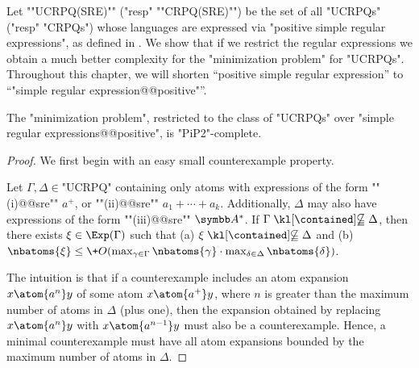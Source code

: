 \AP Let ""UCRPQ(SRE)"" ("resp" ""CRPQ(SRE)"") be the set of all "UCRPQs" ("resp" "CRPQs") whose languages are expressed via "positive simple regular expressions", as defined in . We show that if we restrict the regular expressions we obtain a much better complexity for the "minimization problem" for "UCRPQs".
Throughout this chapter, we will shorten ``positive simple regular expression''
to ``"simple regular expression@@positive"''.

\begin{theorem}\AP\label{thm:minimization-SRE}
	The "minimization problem", restricted to the class of "UCRPQs" over "simple regular expressions@@positive", is "PiP2"-complete.
\end{theorem}

\begin{proof}
	We first begin with an easy small counterexample property.
	\begin{claim}
		\AP\label{cl:small-counterexample-SRE}
		Let $\Gamma, \Delta \in \text{"UCRPQ"}$ containing only atoms with expressions of the form \AP""(i)@@sre"" $a^+$, or ""(ii)@@sre"" $a_1 + \dotsb + a_k$. Additionally, $\Delta$ may also have expressions of the form ""(iii)@@sre"" $\A^*$. If $\Gamma \notcontained \Delta$, then there exists $\anexpansion \in \Exp(\Gamma)$ such that (a) $\anexpansion \notcontained \Delta$ and (b) $\nbatoms{\anexpansion} \leq \+O(\max_{\gamma \in \Gamma}\nbatoms{\gamma} \cdot \max_{\delta \in \Delta}\nbatoms{\delta})$.
	\end{claim}

	The intuition is that if a counterexample includes an atom expansion $x \atom{a^n} y$ of some atom $x \atom{a^+} y$, where $n$ is greater than the maximum number of atoms in $\Delta$ (plus one), then the expansion obtained by replacing $x \atom{a^n} y$ with $x \atom{a^{n-1}} y$ must also be a counterexample. Hence, a minimal counterexample must have all atom expansions bounded by the maximum number of atoms in $\Delta$.


\end{proof}
